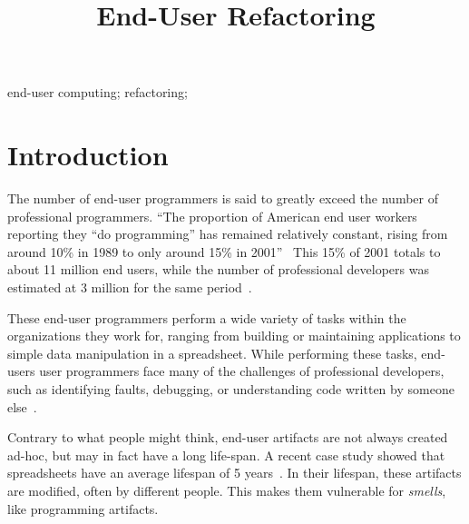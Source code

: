 \documentclass[10pt,conference,compsocconf]{IEEEtran}
\begin{document}
%
\title{End-User Refactoring}

\author{


\and
{}
}

\maketitle

\begin{abstract}
\end{abstract}


\begin{IEEEkeywords}
end-user computing; refactoring; 
\end{IEEEkeywords}

\section{Introduction}
The number of end-user programmers is said to greatly exceed the number of professional programmers. ``The proportion of American end user workers reporting they ``do programming'' has remained relatively constant, rising from around 10\% in 1989 to only around 15\% in 2001''~\cite{Scaf2005} This 15\% of 2001 totals to about 11 million end users, while the number of professional developers was estimated at 3 million for the same period~\cite{Scaf2005}.

These end-user programmers perform a wide variety of tasks within the organizations they work for, ranging from building or maintaining applications to simple data manipulation in a spreadsheet. While performing these tasks, end-users user programmers face many of the challenges of professional developers, such as identifying faults, debugging, or understanding code written by someone else~\cite{Ko2011}.

Contrary to what people might think, end-user artifacts are not always created ad-hoc, but may in fact have a long life-span. A recent case study showed that spreadsheets have an average lifespan of 5 years~\cite{Hermans2011}. In their lifespan, these artifacts are modified, often by different people. This makes them vulnerable for \emph{smells}, like programming artifacts. 
\end{document}
